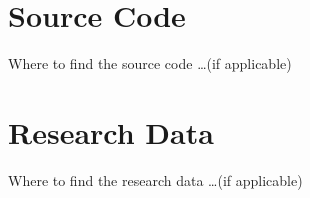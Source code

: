 \chapter{Source Code}

Where to find the source code \ldots (if applicable)

\chapter{Research Data}

Where to find the research data \ldots (if applicable)



